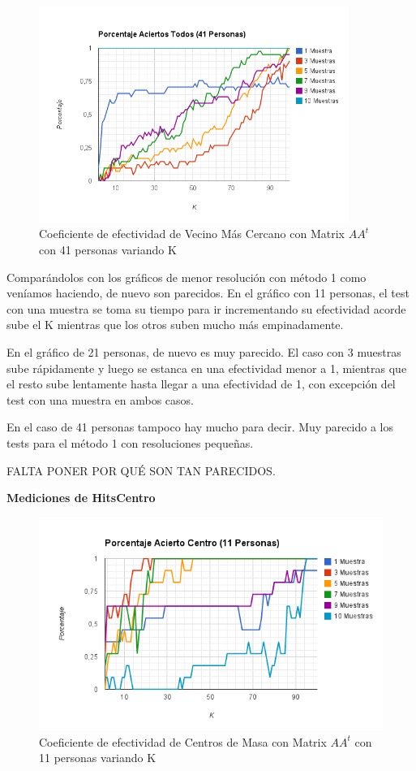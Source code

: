 \begin{figure}[H]
\includegraphics[width=0.9\textwidth]{img/imagef12.png}
     \caption{Coeficiente de efectividad de Vecino Más Cercano con Matrix $AA^t$ con 41 personas variando K}
\end{figure}

Comparándolos con los gráficos de menor resolución con método 1 como veníamos haciendo, de nuevo son
parecidos. En el gráfico con 11 personas, el test con una muestra se toma su tiempo para ir
incrementando su efectividad acorde sube el K mientras que los otros suben mucho más empinadamente.

En el gráfico de 21 personas, de nuevo es muy parecido. El caso con 3 muestras sube rápidamente y
luego se estanca en una efectividad menor a 1, mientras que el resto sube lentamente hasta llegar a
una efectividad de 1, con excepción del test con una muestra en ambos casos.

En el caso de 41 personas tampoco hay mucho para decir. Muy parecido a los tests para el método 1
con resoluciones pequeñas.


FALTA PONER POR QUÉ SON TAN PARECIDOS.

\textbf{Mediciones de HitsCentro }

\begin{figure}[H]
\includegraphics[width=1\textwidth]{img/imagef13.png}
     \caption{Coeficiente de efectividad de Centros de Masa con Matrix $AA^t$ con 11 personas variando K}
\end{figure}


